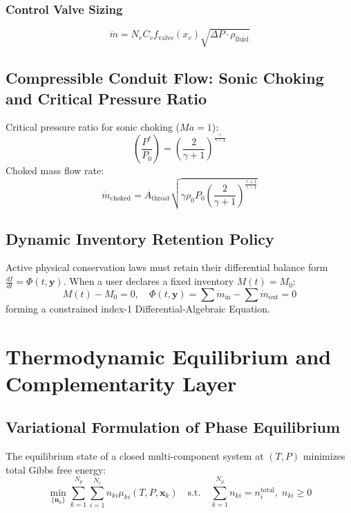 \documentclass[11pt,a4paper]{article}
\begin{document}
\subsubsection{Control Valve Sizing}
\begin{equation}
\dot{m} = N_v C_v f_{\text{valve}}(x_v) \sqrt{\Delta P \cdot \rho_{\text{fluid}}}
\end{equation}

\subsection{Compressible Conduit Flow: Sonic Choking and Critical Pressure Ratio}

Critical pressure ratio for sonic choking ($Ma = 1$):
\begin{equation}
\left( \frac{P^*}{P_0} \right) = \left( \frac{2}{\gamma + 1} \right)^{\frac{\gamma}{\gamma - 1}}
\end{equation}
Choked mass flow rate:
\begin{equation}
\dot{m}_{\text{choked}} = A_{\text{throat}} \sqrt{\gamma \rho_0 P_0 \left( \frac{2}{\gamma + 1} \right)^{\frac{\gamma+1}{\gamma-1}}}
\end{equation}

\subsection{Dynamic Inventory Retention Policy}

Active physical conservation laws must retain their differential balance form $\frac{dI}{dt} = \Phi(t, \mathbf{y})$.
When a user declares a fixed inventory $M(t) = M_0$:
\begin{equation}
M(t) - M_0 = 0, \quad \Phi(t, \mathbf{y}) = \sum \dot{m}_{\text{in}} - \sum \dot{m}_{\text{out}} = 0
\end{equation}
forming a constrained index-1 Differential-Algebraic Equation.

\section{Thermodynamic Equilibrium and Complementarity Layer}

\subsection{Variational Formulation of Phase Equilibrium}

The equilibrium state of a closed multi-component system at $(T, P)$ minimizes total Gibbs free energy:
\begin{equation}
\min_{\{\mathbf{n}_k\}} \sum_{k=1}^{N_p} \sum_{i=1}^{N_c} n_{ki} \mu_{ki}(T, P, \mathbf{x}_k) \quad \text{s.t.} \quad \sum_{k=1}^{N_p} n_{ki} = n_i^{\text{total}}, \; n_{ki} \ge 0
\end{equation}
\end{document}
